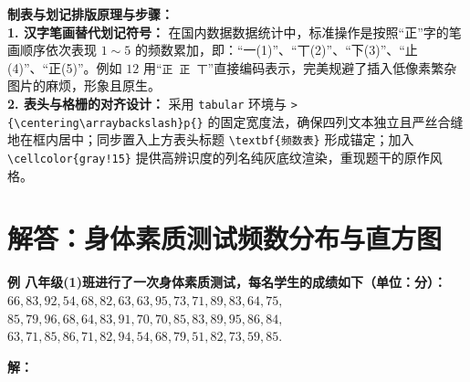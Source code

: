 \vspace{0.6cm}

{\small\color{blue!70!black}
\textbf{制表与划记排版原理与步骤：}\\
\textbf{1. 汉字笔画替代划记符号：} 在国内数据数据统计中，标准操作是按照“正”字的笔画顺序依次表现 $1 \sim 5$ 的频数累加，即：“一(1)”、“丅(2)”、“下(3)”、“止(4)”、“正(5)”。例如 $12$ 用“\texttt{正~正~丅}”直接编码表示，完美规避了插入低像素繁杂图片的麻烦，形象且原生。\\
\textbf{2. 表头与格栅的对齐设计：} 采用 \texttt{tabular} 环境与 \texttt{>\{\textbackslash centering\textbackslash arraybackslash\}p\{\}} 的固定宽度法，确保四列文本独立且严丝合缝地在框内居中；同步置入上方表头标题 \texttt{\textbackslash textbf\{频数表\}} 形成锚定；加入 \texttt{\textbackslash cellcolor\{gray!15\}} 提供高辨识度的列名纯灰底纹渲染，重现题干的原作风格。
}

\newpage



\newpage

\section{解答：身体素质测试频数分布与直方图}

\vspace{0.6cm}

\textbf{例 八年级(1)班进行了一次身体素质测试，每名学生的成绩如下（单位：分）：\\
$66, 83, 92, 54, 68, 82, 63, 63, 95, 73, 71, 89, 83, 64, 75,$ \\
$85, 79, 96, 68, 64, 83, 91, 70, 70, 85, 83, 89, 95, 86, 84,$ \\
$63, 71, 85, 86, 71, 82, 94, 54, 68, 79, 51, 82, 73, 59, 85.$}

\vspace{0.4cm}

\textbf{解：}

